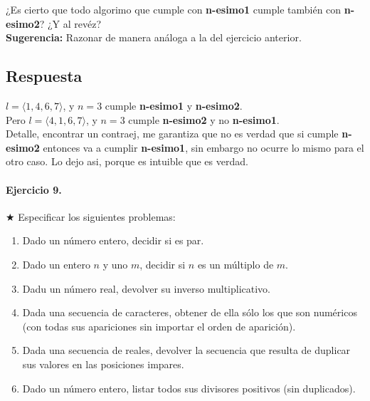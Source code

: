 \documentclass[a4paper]{article}
\begin{document}
¿Es cierto que todo algorimo que cumple con \textbf{n-esimo1} cumple también
 con \textbf{n-esimo2}? ¿Y al revéz?\\
 \textbf{Sugerencia:} Razonar de manera análoga a la del ejercicio anterior.
\subsection*{Respuesta}
$l=\langle 1,4,6,7\rangle$, y $n=3$ cumple \textbf{n-esimo1} y \textbf{n-esimo2}.\\
Pero $l=\langle 4,1,6,7\rangle$, y $n=3$ cumple \textbf{n-esimo2} y no \textbf{n-esimo1}.\\
Detalle, encontrar un contraej, me garantiza que no es verdad que si cumple \textbf{n-esimo2}
entonces va a cumplir \textbf{n-esimo1}, sin embargo no ocurre lo mismo para el otro caso.
Lo dejo asi, porque es intuible que es verdad.
	
\paragraph*{Ejercicio 9.}$\bigstar$ Especificar los siguientes problemas:
	\begin{enumerate}[label=\alph*)]
		\item Dado un número entero, decidir si es par.
		\item Dado un entero $n$ y uno $m$, decidir si $n$ es un múltiplo de $m$.
		\item Dadu un número real, devolver su inverso multiplicativo.
		\item Dada una secuencia de caracteres, obtener de ella sólo los que son numéricos (con todas sus apariciones sin importar el orden de aparición).
		\item Dada una secuencia de reales, devolver la secuencia que resulta de duplicar sus valores en las posiciones impares.
		\item Dado un número entero, listar todos sus divisores positivos (sin duplicados).
	\end{enumerate}
\end{document}
